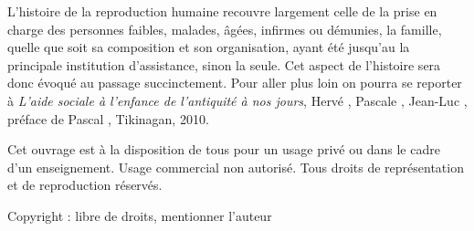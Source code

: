 L'histoire de la reproduction humaine recouvre largement celle
de la prise en charge des personnes faibles, malades, âgées, infirmes ou
démunies, la famille, quelle que soit sa composition et son organisation, ayant été jusqu'au  la principale institution
d'assistance, sinon la seule. Cet aspect de l'histoire sera donc évoqué
au passage succinctement. Pour aller plus loin on
pourra se reporter à \emph{L'aide sociale à l'enfance de l'antiquité à
nos jours}, Hervé , Pascale , Jean-Luc ,
préface de Pascal , Tikinagan, 2010.

Cet ouvrage est à la disposition de tous pour un usage privé ou dans le cadre d'un enseignement. Usage commercial non autorisé. Tous droits de représentation et de reproduction réservés.

Copyright : libre de droits, mentionner l'auteur


